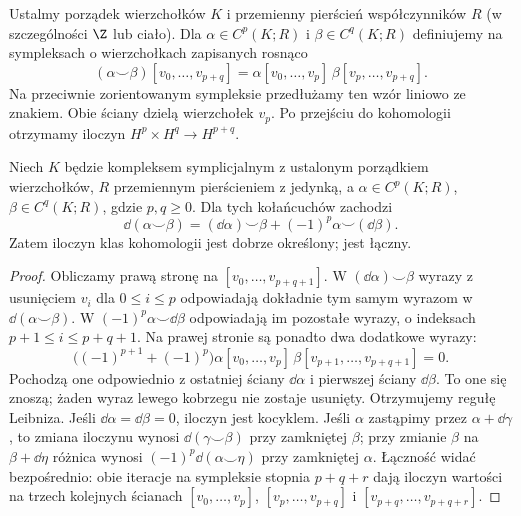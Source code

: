 \begin{definicja}
\label{def:kubek-16}
Ustalmy porządek wierzchołków $K$ i przemienny
pierścień współczynników $R$ (w szczególności $\Z$ lub ciało).
Dla $\alpha\in C^p(K;R)$ i $\beta\in C^q(K;R)$ definiujemy
na sympleksach o wierzchołkach zapisanych rosnąco
\[
(\alpha\smile\beta)
 [v_0,\ldots,v_{p+q}]
=\alpha[v_0,\ldots,v_p]\,
 \beta[v_p,\ldots,v_{p+q}].
\]
Na przeciwnie zorientowanym sympleksie przedłużamy ten
wzór liniowo ze znakiem. Obie ściany dzielą wierzchołek $v_p$.
Po przejściu do kohomologii otrzymamy
iloczyn $H^p\times H^q\to H^{p+q}$.
\end{definicja}

\begin{stwierdzenie}
\label{prop:kubek-leibniz-16}
Niech $K$ będzie kompleksem symplicjalnym z ustalonym
porządkiem wierzchołków, $R$ przemiennym pierścieniem
z jedynką, a $\alpha\in C^p(K;R)$,
$\beta\in C^q(K;R)$, gdzie $p,q\geq0$.
Dla tych kołańcuchów zachodzi
\[
 \dd(\alpha\smile\beta)
 =(\dd\alpha)\smile\beta
       +(-1)^p\alpha\smile(\dd\beta).
\]
Zatem iloczyn klas kohomologii jest
dobrze określony; jest łączny.
\end{stwierdzenie}
\begin{proof}
Obliczamy prawą stronę na $[v_0,\ldots,v_{p+q+1}]$.
W $(\dd\alpha)\smile\beta$ wyrazy z usunięciem
$v_i$ dla $0\leq i\leq p$ odpowiadają dokładnie
tym samym wyrazom w $\dd(\alpha\smile\beta)$.
W $(-1)^p\alpha\smile\dd\beta$ odpowiadają im
pozostałe wyrazy, o indeksach $p+1\leq i\leq p+q+1$.
Na prawej stronie są ponadto dwa dodatkowe wyrazy:
\[
 \bigl((-1)^{p+1}+(-1)^p\bigr)
 \alpha[v_0,\ldots,v_p]\,
 \beta[v_{p+1},\ldots,v_{p+q+1}]=0.
\]
Pochodzą one odpowiednio z ostatniej ściany
$\dd\alpha$ i pierwszej ściany $\dd\beta$.
To one się znoszą; żaden wyraz lewego kobrzegu
nie zostaje usunięty. Otrzymujemy regułę Leibniza.
Jeśli $\dd\alpha=\dd\beta=0$,
iloczyn jest kocyklem.
Jeśli $\alpha$ zastąpimy przez
$\alpha+\dd\gamma$, to zmiana
iloczynu wynosi
$\dd(\gamma\smile\beta)$
przy zamkniętej $\beta$;
przy zmianie $\beta$ na $\beta+\dd\eta$ różnica
wynosi $(-1)^p\dd(\alpha\smile\eta)$ przy zamkniętej $\alpha$.
Łączność widać bezpośrednio:
obie iteracje na sympleksie
stopnia $p+q+r$ dają iloczyn
wartości na trzech kolejnych
ścianach
$[v_0,\ldots,v_p]$,
$[v_p,\ldots,v_{p+q}]$ i
$[v_{p+q},\ldots,v_{p+q+r}]$.
\end{proof}

